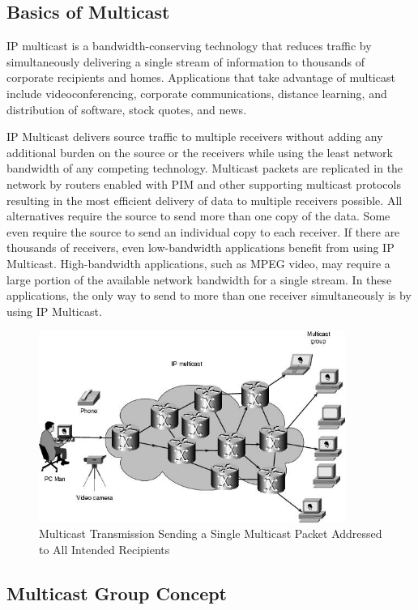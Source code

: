 \subsection{Basics of Multicast}

\cite{cisco:multicast}
\ac{IP} multicast is a bandwidth-conserving technology that
reduces traffic by simultaneously delivering a single stream of information
to thousands of corporate recipients and homes. Applications that take
advantage of multicast include videoconferencing, corporate communications,
distance learning, and distribution of software, stock quotes, and news.

IP Multicast delivers source traffic to multiple receivers without adding
any additional burden on the source or the receivers while using the least
network bandwidth of any competing technology. Multicast packets are
replicated in the network by routers enabled with
\ac{PIM} and other supporting multicast protocols
resulting in the most efficient delivery of data to multiple receivers
possible. All alternatives require the source to send more than one copy of
the data. Some even require the source to send an individual copy to each
receiver. If there are thousands of receivers, even low-bandwidth
applications benefit from using IP Multicast. High-bandwidth
applications, such as MPEG video, may require a large portion of the
available network bandwidth for a single stream. In these applications, the
only way to send to more than one receiver simultaneously is by using IP
Multicast.


\begin{figure}[h]
\includegraphics[width=10cm]{img/multicast}
\caption{Multicast Transmission Sending a Single Multicast Packet Addressed
to All Intended Recipients}
\label{fig:multicast}
\end{figure}

\subsection{Multicast Group Concept}

